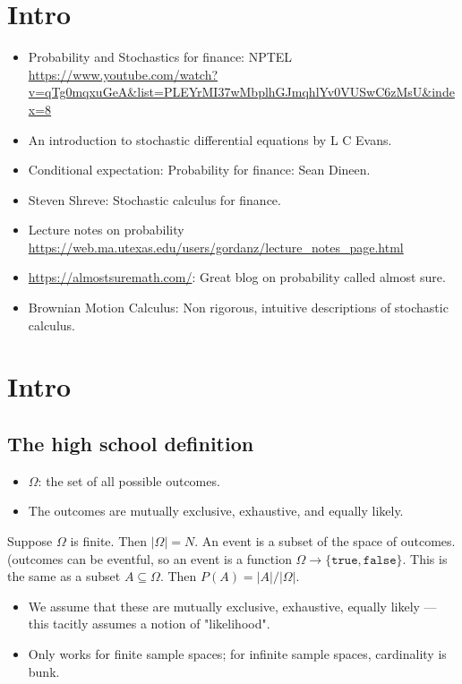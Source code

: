 \documentclass{book}
\theoremstyle{definition}
\begin{document}
\tableofcontents


\chapter{Intro}
\begin{itemize}
\item Probability and Stochastics for finance: NPTEL
\url{https://www.youtube.com/watch?v=qTg0mqxuGeA&list=PLEYrMI37wMbplhGJmqhlYv0VUSwC6zMsU&index=8}
\item An introduction to stochastic differential equations by L C Evans.
\item Conditional expectation: Probability for finance: Sean Dineen.
\item Steven Shreve: Stochastic calculus for finance.
\item Lecture notes on probability \url{https://web.ma.utexas.edu/users/gordanz/lecture_notes_page.html}
\item \url{https://almostsuremath.com/}: Great blog on probability called almost sure.
\item Brownian Motion Calculus: Non rigorous, intuitive descriptions of stochastic calculus.
\end{itemize}
\chapter{Intro}

\section{The high school definition}
\begin{itemize}
\item $\Omega$: the set of all possible outcomes.
\item The outcomes are mutually exclusive, exhaustive, and equally likely.
\end{itemize}

Suppose $\Omega$ is finite. Then $|\Omega| = N$. An event is a subset of the space of outcomes.
(outcomes can be eventful, so an event is a function $\Omega \rightarrow \{ \texttt{true}, \texttt{false} \}$.
This is the same as a subset $A \subseteq \Omega$.  Then $P(A) = |A|/|\Omega|$.

\begin{itemize}
\item We assume that these are mutually exclusive, exhaustive, equally likely
--- this tacitly assumes a notion of "likelihood".
\item Only works for finite sample spaces; for infinite sample spaces, cardinality is bunk.
\end{itemize}
\end{document}
